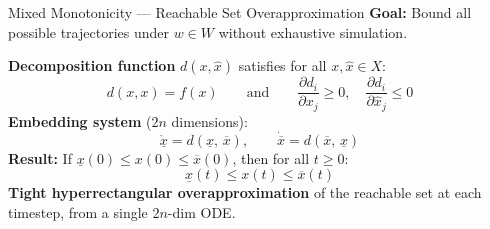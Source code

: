 \begin{frame}{Mixed Monotonicity --- Reachable Set Overapproximation}
  \hypertarget{backup:mixed-monotonicity}{}
  \footnotesize
  \textbf{Goal:} Bound all possible trajectories under $w \in W$ without exhaustive simulation.

  \vskip4pt
  \textbf{Decomposition function} $d(x, \hat{x})$ satisfies for all $x, \hat{x} \in X$:
  \vskip-6pt
  \scriptsize
  \[ d(x, x) = f(x) \qquad \text{and} \qquad \frac{\partial d_i}{\partial x_j} \geq 0, \quad \frac{\partial d_i}{\partial \hat{x}_j} \leq 0 \]
  \vskip0pt
  \footnotesize
  \textbf{Embedding system} ($2n$ dimensions):
  \vskip-6pt
  \scriptsize
  \[ \dot{\underline{x}} = d(\underline{x},\, \overline{x}), \qquad \dot{\overline{x}} = d(\overline{x},\, \underline{x}) \]
  \vskip0pt
  \footnotesize
  \textbf{Result:} If $\underline{x}(0) \leq x(0) \leq \overline{x}(0)$, then for all $t \geq 0$:
  \vskip-6pt
  \[ \underline{x}(t) \leq x(t) \leq \overline{x}(t) \]
  \vskip0pt
  \textbf{Tight hyperrectangular overapproximation} of the reachable set at each timestep, from a single $2n$-dim ODE.
\end{frame}

